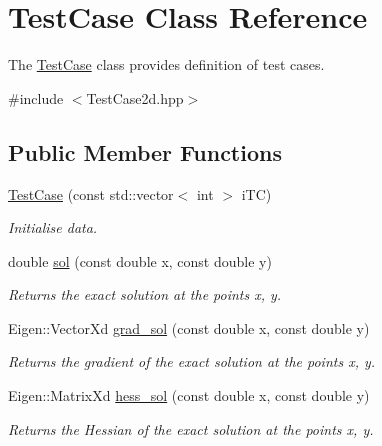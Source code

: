 \hypertarget{classTestCase}{}\section{Test\+Case Class Reference}
\label{classTestCase}


The \hyperlink{classTestCase}{Test\+Case} class provides definition of test cases.  




{\ttfamily \#include $<$Test\+Case2d.\+hpp$>$}

\subsection*{Public Member Functions}
\begin{DoxyCompactItemize}
\item 
\hyperlink{classTestCase_aa4ad29533416ee515205db87002a1bf1}{Test\+Case} (const std\+::vector$<$ int $>$ i\+TC)
\begin{DoxyCompactList}\small\item\em Initialise data. \end{DoxyCompactList}\item 
double \hyperlink{classTestCase_aede719dac81c460c713d930a379c537e}{sol} (const double x, const double y)
\begin{DoxyCompactList}\small\item\em Returns the exact solution at the points x, y. \end{DoxyCompactList}\item 
\mbox{\label{classTestCase_ac6ea8a6757e14702acde6aa73270c5b8}} 
Eigen\+::\+Vector\+Xd \hyperlink{classTestCase_ac6ea8a6757e14702acde6aa73270c5b8}{grad\+\_\+sol} (const double x, const double y)
\begin{DoxyCompactList}\small\item\em Returns the gradient of the exact solution at the points x, y. \end{DoxyCompactList}\item 
\mbox{\label{classTestCase_aefa0d363c18d007e5fa7c75df2c319fa}} 
Eigen\+::\+Matrix\+Xd \hyperlink{classTestCase_aefa0d363c18d007e5fa7c75df2c319fa}{hess\+\_\+sol} (const double x, const double y)
\begin{DoxyCompactList}\small\item\em Returns the Hessian of the exact solution at the points x, y. \end{DoxyCompactList}\item 

\end{DoxyCompactItemize}
